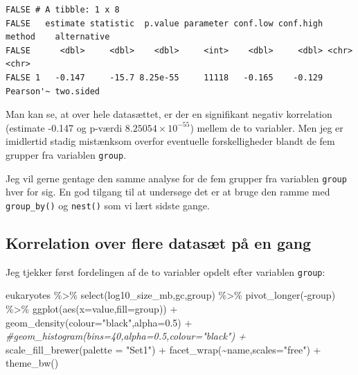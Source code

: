 \documentclass[
]{book}
\newenvironment{Shaded}{\begin{snugshade}}{\end{snugshade}}
\newcommand{\AttributeTok}[1]{\textcolor[rgb]{0.77,0.63,0.00}{#1}}
\newcommand{\CommentTok}[1]{\textcolor[rgb]{0.56,0.35,0.01}{\textit{#1}}}
\newcommand{\FloatTok}[1]{\textcolor[rgb]{0.00,0.00,0.81}{#1}}
\newcommand{\FunctionTok}[1]{\textcolor[rgb]{0.00,0.00,0.00}{#1}}
\newcommand{\NormalTok}[1]{#1}
\newcommand{\SpecialCharTok}[1]{\textcolor[rgb]{0.00,0.00,0.00}{#1}}
\newcommand{\StringTok}[1]{\textcolor[rgb]{0.31,0.60,0.02}{#1}}
\begin{document}
\begin{verbatim}
FALSE # A tibble: 1 x 8
FALSE   estimate statistic  p.value parameter conf.low conf.high method    alternative
FALSE      <dbl>     <dbl>    <dbl>     <int>    <dbl>     <dbl> <chr>     <chr>      
FALSE 1   -0.147     -15.7 8.25e-55     11118   -0.165    -0.129 Pearson'~ two.sided
\end{verbatim}

Man kan se, at over hele datasættet, er der en signifikant negativ korrelation (estimate -0.147 og p-værdi \ensuremath{8.25054\times 10^{-55}}) mellem de to variabler. Men jeg er imidlertid stadig mistænksom overfor eventuelle forskelligheder blandt de fem grupper fra variablen \texttt{group}.

Jeg vil gerne gentage den samme analyse for de fem grupper fra variablen \texttt{group} hver for sig. En god tilgang til at undersøge det er at bruge den ramme med \texttt{group\_by()} og \texttt{nest()} som vi lært sidste gange.

\hypertarget{korrelation-over-flere-datasuxe6t-puxe5-en-gang}{%
\subsection{Korrelation over flere datasæt på en gang}\label{korrelation-over-flere-datasuxe6t-puxe5-en-gang}}

Jeg tjekker først fordelingen af de to variabler opdelt efter variablen \texttt{group}:

\begin{Shaded}
\begin{Highlighting}[]
\NormalTok{eukaryotes }\SpecialCharTok{\%\textgreater{}\%}
  \FunctionTok{select}\NormalTok{(log10\_size\_mb,gc,group) }\SpecialCharTok{\%\textgreater{}\%} 
  \FunctionTok{pivot\_longer}\NormalTok{(}\SpecialCharTok{{-}}\NormalTok{group) }\SpecialCharTok{\%\textgreater{}\%}
  \FunctionTok{ggplot}\NormalTok{(}\FunctionTok{aes}\NormalTok{(}\AttributeTok{x=}\NormalTok{value,}\AttributeTok{fill=}\NormalTok{group)) }\SpecialCharTok{+} 
  \FunctionTok{geom\_density}\NormalTok{(}\AttributeTok{colour=}\StringTok{"black"}\NormalTok{,}\AttributeTok{alpha=}\FloatTok{0.5}\NormalTok{) }\SpecialCharTok{+}
  \CommentTok{\#geom\_histogram(bins=40,alpha=0.5,colour="black") +}
  \FunctionTok{scale\_fill\_brewer}\NormalTok{(}\AttributeTok{palette =} \StringTok{"Set1"}\NormalTok{) }\SpecialCharTok{+}
  \FunctionTok{facet\_wrap}\NormalTok{(}\SpecialCharTok{\textasciitilde{}}\NormalTok{name,}\AttributeTok{scales=}\StringTok{"free"}\NormalTok{) }\SpecialCharTok{+}
  \FunctionTok{theme\_bw}\NormalTok{()}
\end{Highlighting}
\end{Shaded}
\end{document}

